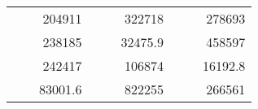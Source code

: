 \begin{table}[H]
\begin{tabular}{|ccrccrccc}
\rowcolor[HTML]{DAE8FC} 
\multicolumn{1}{|c|}{\cellcolor[HTML]{FFFFC7}}                                & \multicolumn{1}{c|}{\cellcolor[HTML]{DAE8FC}}                      & \multicolumn{1}{r|}{\cellcolor[HTML]{DAE8FC}204911}    & \multicolumn{1}{c|}{\cellcolor[HTML]{FFFFC7}}                                & \multicolumn{1}{c|}{\cellcolor[HTML]{DAE8FC}}                       & \multicolumn{1}{r|}{\cellcolor[HTML]{DAE8FC}322718}    & \multicolumn{1}{c|}{\cellcolor[HTML]{FFFFC7}}                                & \multicolumn{1}{c|}{\cellcolor[HTML]{DAE8FC}}                      & \multicolumn{1}{r|}{\cellcolor[HTML]{DAE8FC}278693}    \\ \cline{3-3} \cline{6-6} \cline{9-9} 
\multicolumn{1}{|c|}{\cellcolor[HTML]{FFFFC7}}                                & \multicolumn{1}{c|}{\cellcolor[HTML]{DAE8FC}}                      & \multicolumn{1}{r|}{\cellcolor[HTML]{DDFDFF}238185}    & \multicolumn{1}{c|}{\cellcolor[HTML]{FFFFC7}}                                & \multicolumn{1}{c|}{\cellcolor[HTML]{DAE8FC}}                       & \multicolumn{1}{r|}{\cellcolor[HTML]{DDFDFF}32475.9}   & \multicolumn{1}{c|}{\cellcolor[HTML]{FFFFC7}}                                & \multicolumn{1}{c|}{\cellcolor[HTML]{DAE8FC}}                      & \multicolumn{1}{r|}{\cellcolor[HTML]{DDFDFF}458597}    \\ \cline{3-3} \cline{6-6} \cline{9-9} 
\rowcolor[HTML]{DAE8FC} 
\multicolumn{1}{|c|}{\cellcolor[HTML]{FFFFC7}}                                & \multicolumn{1}{c|}{\cellcolor[HTML]{DAE8FC}}                      & \multicolumn{1}{r|}{\cellcolor[HTML]{DAE8FC}242417}    & \multicolumn{1}{c|}{\cellcolor[HTML]{FFFFC7}}                                & \multicolumn{1}{c|}{\cellcolor[HTML]{DAE8FC}}                       & \multicolumn{1}{r|}{\cellcolor[HTML]{DAE8FC}106874}    & \multicolumn{1}{c|}{\cellcolor[HTML]{FFFFC7}}                                & \multicolumn{1}{c|}{\cellcolor[HTML]{DAE8FC}}                      & \multicolumn{1}{r|}{\cellcolor[HTML]{DAE8FC}16192.8}   \\ \cline{3-3} \cline{6-6} \cline{9-9} 
\multicolumn{1}{|c|}{\cellcolor[HTML]{FFFFC7}}                                & \multicolumn{1}{c|}{\cellcolor[HTML]{DAE8FC}}                      & \multicolumn{1}{r|}{\cellcolor[HTML]{DDFDFF}83001.6}   & \multicolumn{1}{c|}{\cellcolor[HTML]{FFFFC7}}                                & \multicolumn{1}{c|}{\cellcolor[HTML]{DAE8FC}}                       & \multicolumn{1}{r|}{\cellcolor[HTML]{DDFDFF}822255}    & \multicolumn{1}{c|}{\cellcolor[HTML]{FFFFC7}}                                & \multicolumn{1}{c|}{\cellcolor[HTML]{DAE8FC}}                      & \multicolumn{1}{r|}{\cellcolor[HTML]{DDFDFF}266561}    \\ \cline{3-3} \cline{6-6} \cline{9-9} 

\end{tabular}
\end{table}
